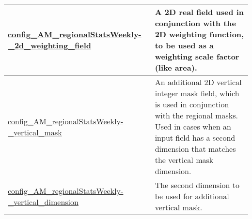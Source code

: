 {\begin{center}
\begin{longtable}{| p{2.0in} || p{4.0in} |}
    \hline
    \hyperref[subsec:nm_sec_config_AM_regionalStatsWeekly_2d_weighting_field]{config\_AM\_regionalStatsWeekly-}\hyperref[subsec:nm_sec_config_AM_regionalStatsWeekly_2d_weighting_field]{\_2d\_weighting\_field}& A 2D real field used in conjunction with the 2D weighting function, to be used as a weighting scale factor (like area). \\
    \hline
    \hyperref[subsec:nm_sec_config_AM_regionalStatsWeekly_vertical_mask]{config\_AM\_regionalStatsWeekly-}\hyperref[subsec:nm_sec_config_AM_regionalStatsWeekly_vertical_mask]{\_vertical\_mask}& An additional 2D vertical integer mask field, which is used in conjunction with the regional masks. Used in cases when an input field has a second dimension that matches the vertical mask dimension. \\
    \hline
    \hyperref[subsec:nm_sec_config_AM_regionalStatsWeekly_vertical_dimension]{config\_AM\_regionalStatsWeekly-}\hyperref[subsec:nm_sec_config_AM_regionalStatsWeekly_vertical_dimension]{\_vertical\_dimension}& The second dimension to be used for additional vertical mask. \\
    \hline
\end{longtable}
\end{center}
}
